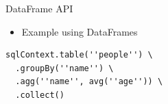 \begin{frame}[fragile=singleslide]{DataFrame API}
\begin{itemize}
	\item Example using DataFrames
\end{itemize}

\begin{verbatim}
sqlContext.table(''people'') \
  .groupBy(''name'') \
  .agg(''name'', avg(''age'')) \
  .collect()
\end{verbatim}

\end{frame}
